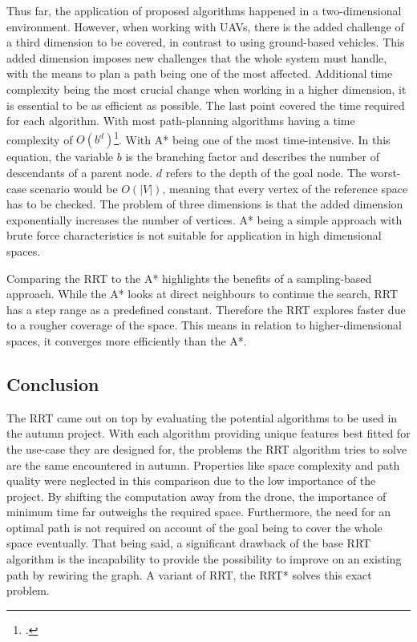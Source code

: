 Thus far, the application of proposed algorithms happened in a two-dimensional environment. However, when working with UAVs, there is the added challenge of a third dimension to be covered, in contrast to using ground-based vehicles. This added dimension imposes new challenges that the whole system must handle, with the means to plan a path being one of the most affected.
Additional time complexity being the most crucial change when working in a higher dimension, it is essential to be as efficient as possible. The last point covered the time required for each algorithm. With most path-planning algorithms having a time complexity of \(O\left(b^d\right)\)\footcite{stackexchangeAstarTimeComplexity2019}. With A* being one of the most time-intensive.
In this equation, the variable $b$ is the branching factor and describes the number of descendants of a parent node. $d$ refers to the depth of the goal node. The worst-case scenario would be \(O\left(|V|\right)\), meaning that every vertex of the reference space has to be checked. The problem of three dimensions is that the added dimension exponentially increases the number of vertices. A* being a simple approach with brute force characteristics is not suitable for application in high dimensional spaces. 

Comparing the RRT to the A* highlights the benefits of a sampling-based approach. While the A* looks at direct neighbours to continue the search, RRT has a step range as a predefined constant. Therefore the RRT explores faster due to a rougher coverage of the space. This means in relation to higher-dimensional spaces, it converges more efficiently than the A*.

\subsection{Conclusion}

The RRT came out on top by evaluating the potential algorithms to be used in the autumn project. With each algorithm providing unique features best fitted for the use-case they are designed for, the problems the RRT algorithm tries to solve are the same encountered in autumn. Properties like space complexity and path quality were neglected in this comparison due to the low importance of the project. By shifting the computation away from the drone, the importance of minimum time far outweighs the required space. Furthermore, the need for an optimal path is not required on account of the goal being to cover the whole space eventually. That being said, a significant drawback of the base RRT algorithm is the incapability to provide the possibility to improve on an existing path by rewiring the graph. A variant of RRT, the RRT* solves this exact problem.


